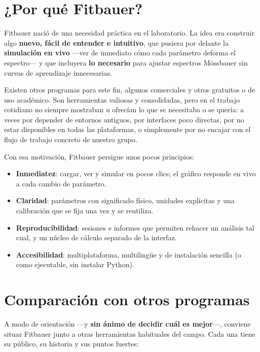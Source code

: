 \section{¿Por qué Fitbauer?}
\label{sec:porque}

Fitbauer nació de una necesidad práctica en el laboratorio. La idea era construir
algo \textbf{nuevo, fácil de entender e intuitivo}, que pusiera por delante la
\textbf{simulación en vivo} —ver de inmediato cómo cada parámetro deforma el
espectro— y que incluyera \textbf{lo necesario} para ajustar espectros Mössbauer
sin curvas de aprendizaje innecesarias.

Existen otros programas para este fin, algunos comerciales y otros gratuitos o de
uso académico. Son herramientas valiosas y consolidadas, pero en el trabajo
cotidiano no siempre mostraban u ofrecían lo que se necesitaba o se quería: a
veces por depender de entornos antiguos, por interfaces poco directas, por no
estar disponibles en todas las plataformas, o simplemente por no encajar con el
flujo de trabajo concreto de nuestro grupo.

Con esa motivación, Fitbauer persigue unos pocos principios:

\begin{itemize}[nosep]
  \item \textbf{Inmediatez}: cargar, ver y simular en pocos clics; el gráfico
        responde en vivo a cada cambio de parámetro.
  \item \textbf{Claridad}: parámetros con significado físico, unidades explícitas
        y una calibración que se fija una vez y se reutiliza.
  \item \textbf{Reproducibilidad}: sesiones e informes que permiten rehacer un
        análisis tal cual, y un núcleo de cálculo separado de la interfaz.
  \item \textbf{Accesibilidad}: multiplataforma, multilingüe y de instalación
        sencilla (o como ejecutable, sin instalar Python).
\end{itemize}

\section{Comparación con otros programas}
\label{sec:comparacion}

A modo de orientación —y \textbf{sin ánimo de decidir cuál es mejor}—, conviene
situar Fitbauer junto a otras herramientas habituales del campo. Cada una tiene
su público, su historia y sus puntos fuertes:


